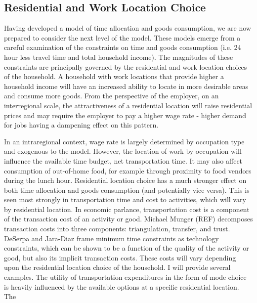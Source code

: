 \subsection{Residential and Work Location Choice}
Having developed a model of time allocation and goods consumption, we are now prepared to consider the next level of the model. These models emerge from a careful examination of the constraints on time and goods consumption (i.e. 24 hour less travel time and total household income). The magnitudes of these constraints are principally governed by the residential and work location choices of the household. A household with work locations that provide higher a household income will have an increased ability to locate in more desirable areas and consume more goods. From the perspective of the employer, on an interregional scale, the attractiveness of a residential location will raise residential prices and may require the employer to pay a higher wage rate - higher demand for jobs having a dampening effect on this pattern.

In an intraregional context, wage rate is largely determined by occupation type and exogenous to the model. However, the location of work by occupation will influence the available time budget, net transportation time. It may also affect consumption of out-of-home food, for example through proximity to food vendors during the lunch hour. Residential location choice has a much stronger effect on both time allocation and goods consumption (and potentially vice versa). This is seen most strongly in transportation time and cost to activities, which will vary by residential location. In economic parlance, transportation cost is a component of the transaction cost of an activity or good. Michael Munger (REF) decomposes transaction costs into three components: triangulation, transfer, and trust. DeSerpa and Jara-Diaz \cite{DeSerpa1971,Jara-Diaz2000} frame minimum time constraints as technology constraints, which can be shown to be a function of the quality of the activity or good, but also its implicit transaction costs. These costs will vary depending upon the residential location choice of the household. I will provide several examples. The utility of transportation expenditures in the form of mode choice is heavily influenced by the available options at a specific residential location. The 

